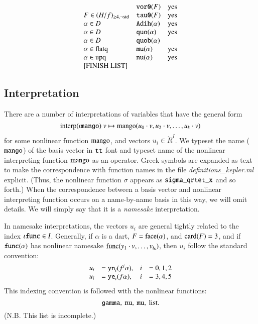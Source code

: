 \begin{definition}
$$\begin{array}{llll}
        &\optt{vor0}(F)
        &\text{yes}\\
        F\in (H/f)_{\ge4,\neg\op{std}}
        &\optt{tau0}(F)
        &\text{yes}\\
        \alpha\in D
        &\optt{Adih}(\alpha)
        &\text{yes}\\
        \alpha\in D
        &\optt{quo}(\alpha)
        &\text{yes}\\
        \alpha\in D
        &\optt{quob}(\alpha)
        &\\
        \alpha \in \op{flatq}
        &\optt{mu}(\alpha)
        &\text{yes}\\
        \alpha\in \op{upq}
        &\optt{nu}(\alpha)
        &\text{yes}\\
        \text{[FINISH LIST]} %
    \end{array}
    $$
\end{definition}

\subsection{Interpretation}

There are a number of interpretations of variables that have the
general form
    $${\operatorname{interp}}(\iota{\operatorname{{\texttt{mango}}}})\ v\mapsto
    {\operatorname{mango}}(u_0\cdot v,u_2\cdot v,\ldots,u_k\cdot v)$$
for some nonlinear function ${\operatorname{mango}}$, and vectors $u_i\in
\ring{R}^I$.  We typeset the name (${\operatorname{{\texttt{mango}}}}$) of the basis
vector in ${\operatorname{{\texttt{tt}}}}$ font and typeset name of the nonlinear
interpreting function ${\operatorname{mango}}$ as an operator. Greek symbols
are expanded as text to make the correspondence with function
names in the file
    {\it definitions\_kepler.ml} explicit. (Thus, the nonlinear
    function $\sigma$ appears
    as ${\operatorname{{\texttt{sigma\_qrtet\_x}}}}$ and so forth.)
When the correspondence between a basis vector and nonlinear
interpreting function occurs on a name-by-name basis in this way,
we will omit details.  We will simply say that it is a {\it
namesake} interpretation.

In namesake interpretations, the vectors $u_i$ are general tightly
related to the index $\iota{\operatorname{{\texttt{func}}}}\in I$.  Generally, if
$\alpha$ is a dart, $F={\operatorname{face}}(\alpha)$,  and ${\operatorname{card}}(F)=3$, and
if ${\operatorname{{\texttt{func}}}}(\alpha)$ has nonlinear namesake
${\operatorname{func}}(y_1\cdot v,\ldots,v_{i_6})$, then $u_i$ follow the
standard convention:
    $$
    \begin{array}{llll}
    u_i &= {\operatorname{{\texttt{yn}}}}_i(f^i\alpha), &i &=0,1,2\\
    u_i &= {\operatorname{{\texttt{ye}}}}_i(f\alpha), &i &=3,4,5
    \end{array}
    $$
This indexing convention is followed with the nonlinear functions:
    $$
    {\operatorname{{\texttt{gamma}}}},\ {\operatorname{{\texttt{nu}}}},\ {\operatorname{{\texttt{mu}}}},\ \text{list.}
    $$
(N.B. This list is incomplete.) %


